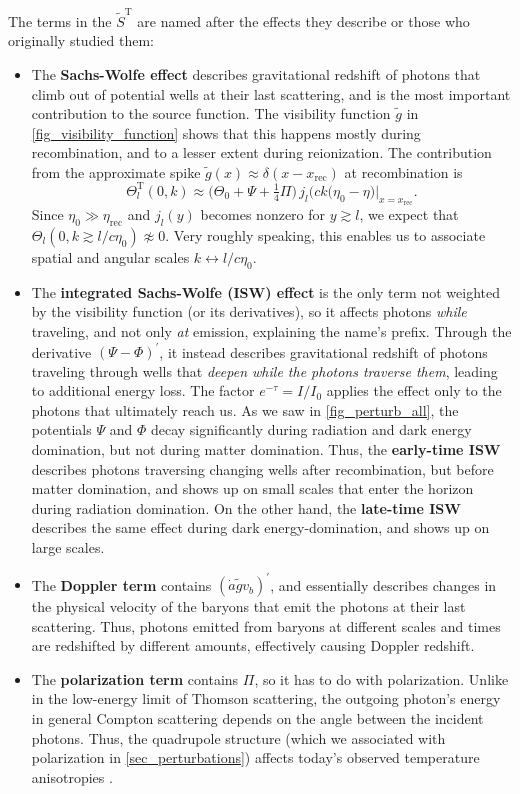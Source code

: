 \documentclass[10pt,a4paper]{article}
\begin{document}
The terms in the $\tilde{S}^\text{T}$ are named after the effects they describe or those who originally studied them:
\begin{itemize}
\item
The \textbf{Sachs-Wolfe effect} describes gravitational redshift of photons that climb out of potential wells at their last scattering,
and is the most important contribution to the source function.
The visibility function $\tilde{g}$ in \cref{fig_visibility_function} shows that this happens mostly during recombination,
and to a lesser extent during reionization.
The contribution from the approximate spike $\tilde{g}(x) \approx \delta(x-x_\text{rec})$ at recombination is
\begin{equation}
	\Theta^\text{T}_l(0,k) \approx \big(\Theta_0 + \Psi + \tfrac14 \Pi \big) \, j_l\big(ck(\eta_0-\eta\big) \Big|_{x=x_\text{rec}}.
\end{equation}
Since $\eta_0 \gg \eta_\text{rec}$ and $j_l(y)$ becomes nonzero for $y \gtrsim l$,
we expect that $\Theta_l(0,k \gtrsim l / c \eta_0) \not\approx 0$.
Very roughly speaking,
this enables us to associate spatial and angular scales $k \leftrightarrow l/c\eta_0$.

\item
The \textbf{integrated Sachs-Wolfe (ISW) effect} is the only term not weighted by the visibility function (or its derivatives),
so it affects photons \emph{while} traveling, and not only \emph{at} emission,
explaining the name's prefix.
Through the derivative $(\Psi-\Phi)^\prime$,
it instead describes gravitational redshift of photons traveling through wells that \emph{deepen while the photons traverse them},
leading to additional energy loss.
The factor $e^{-\tau} = I/I_0$ applies the effect only to the photons that ultimately reach us.
As we saw in \cref{fig_perturb_all}, the potentials $\Psi$ and $\Phi$ decay significantly during radiation and dark energy domination, but not during matter domination.
Thus, the \textbf{early-time ISW} describes photons traversing changing wells after recombination, but before matter domination, and shows up on small scales that enter the horizon during radiation domination.
On the other hand, the \textbf{late-time ISW} describes the same effect during dark energy-domination,
and shows up on large scales.

\item
The \textbf{Doppler term} contains $(\dot{a} \tilde{g} v_b)^\prime$,
and essentially describes changes in the physical velocity of the baryons that emit the photons at their last scattering.
Thus, photons emitted from baryons at different scales and times are redshifted by different amounts,
effectively causing Doppler redshift.

\item
The \textbf{polarization term} contains $\Pi$, so it has to do with polarization.
Unlike in the low-energy limit of Thomson scattering,
the outgoing photon's energy in general Compton scattering
depends on the angle between the incident photons.
Thus, the quadrupole structure (which we associated with polarization in \cref{sec_perturbations})
affects today's observed temperature anisotropies \cite{kableDeconstructingPlanckTT2020}.
\end{itemize}
\end{document}
